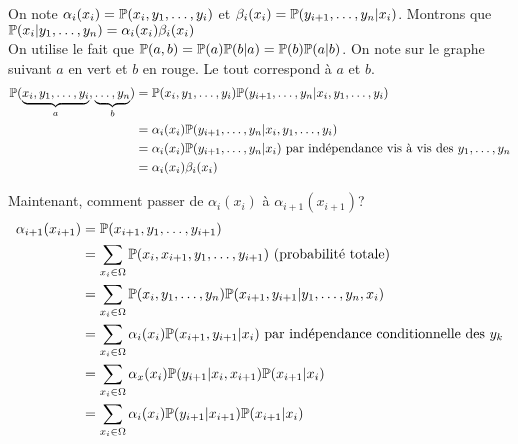 
On note $\alpha_i(x_i) = \P(x_i, y_1, \ldots, y_i)$ et $\beta_i(x_i) = \P(y_{i+1}, \ldots, y_n \vert x_i)$.
Montrons que $\P(x_i \vert y_1,\ldots, y_n) = \alpha_i(x_i)\beta_i(x_i)$ \\

On utilise le fait que $\P(a,b) = \P(a) \P(b \vert a) = \P(b) \P(a \vert b)$. On note sur le graphe suivant $a$ en vert et $b$ en rouge. Le tout correspond à $a$ et $b$.
\begin{equation*}
\begin{split}
  \P( \underbrace{x_i, y_1,\ldots,y_i}_{a},\underbrace{\ldots,y_n}_b) &= \P(x_i,y_1,\ldots,y_i) \P(y_{i+1},\ldots,y_n \vert x_i, y_1,\ldots,y_i) \\
  &= \alpha_i(x_i)  \P(y_{i+1},\ldots,y_n \vert x_i, y_1,\ldots,y_i) \\
  &= \alpha_i(x_i)  \P(y_{i+1},\ldots,y_n \vert x_i) \text{ par indépendance vis à vis des } y_1,\ldots,y_n\\
  &= \alpha_i(x_i) \beta_i(x_i)  \\
\end{split}
\end{equation*}

Maintenant, comment passer de $\alpha_i(x_i)$ à  $\alpha_{i+1}(x_{i+1})$?
\newcommand{\sumx}{\sum_{x_i \in \Omega}}
\begin{equation*}
\begin{split}
  \alpha_{i+1}(x_{i+1}) &= \P(x_{i+1},y_1,\ldots,y_{i+1}) \\
  &= \sumx \P(x_i,x_{i+1}, y_1, \ldots, y_{i+1}) \text{ (probabilité totale)} \\
  &= \sumx \P(x_i, y_1,\ldots,y_n) \P(x_{i+1},y_{i+1} \vert y_1,\ldots, y_n, x_i) \\
  &= \sumx \alpha_i(x_i) \P(x_{i+1}, y_{i+1} \vert x_i) \text{ par indépendance conditionnelle des } y_k \\
  &= \sumx \alpha_x(x_i) \P(y_{i+1} \vert x_i, x_{i+1}) \P(x_{i+1}\vert x_i) \\
  &= \sumx \alpha_i(x_i) \P(y_{i+1}\vert x_{i+1}) \P(x_{i+1} \vert x_i) 
\end{split}
\end{equation*}

